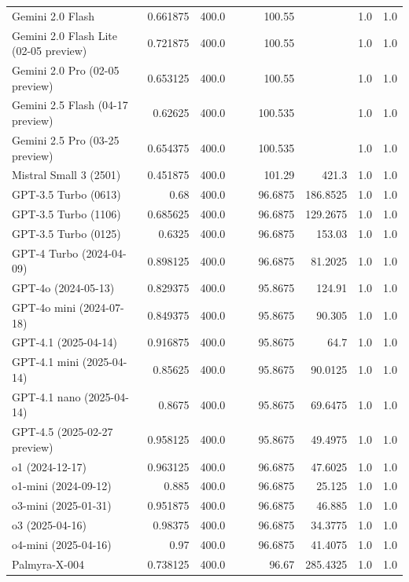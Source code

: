 \begin{table}[htp]
{\begin{tabular}{lrrrrrrrr}
Gemini 2.0 Flash & 0.661875 & 400.0 &  &  & 100.55 &  & 1.0 & 1.0 \\
Gemini 2.0 Flash Lite (02-05 preview) & 0.721875 & 400.0 &  &  & 100.55 &  & 1.0 & 1.0 \\
Gemini 2.0 Pro (02-05 preview) & 0.653125 & 400.0 &  &  & 100.55 &  & 1.0 & 1.0 \\
Gemini 2.5 Flash (04-17 preview) & 0.62625 & 400.0 &  &  & 100.535 &  & 1.0 & 1.0 \\
Gemini 2.5 Pro (03-25 preview) & 0.654375 & 400.0 &  &  & 100.535 &  & 1.0 & 1.0 \\
Mistral Small 3 (2501) & 0.451875 & 400.0 &  &  & 101.29 & 421.3 & 1.0 & 1.0 \\
GPT-3.5 Turbo (0613) & 0.68 & 400.0 &  &  & 96.6875 & 186.8525 & 1.0 & 1.0 \\
GPT-3.5 Turbo (1106) & 0.685625 & 400.0 &  &  & 96.6875 & 129.2675 & 1.0 & 1.0 \\
GPT-3.5 Turbo (0125) & 0.6325 & 400.0 &  &  & 96.6875 & 153.03 & 1.0 & 1.0 \\
GPT-4 Turbo (2024-04-09) & 0.898125 & 400.0 &  &  & 96.6875 & 81.2025 & 1.0 & 1.0 \\
GPT-4o (2024-05-13) & 0.829375 & 400.0 &  &  & 95.8675 & 124.91 & 1.0 & 1.0 \\
GPT-4o mini (2024-07-18) & 0.849375 & 400.0 &  &  & 95.8675 & 90.305 & 1.0 & 1.0 \\
GPT-4.1 (2025-04-14) & 0.916875 & 400.0 &  &  & 95.8675 & 64.7 & 1.0 & 1.0 \\
GPT-4.1 mini (2025-04-14) & 0.85625 & 400.0 &  &  & 95.8675 & 90.0125 & 1.0 & 1.0 \\
GPT-4.1 nano (2025-04-14) & 0.8675 & 400.0 &  &  & 95.8675 & 69.6475 & 1.0 & 1.0 \\
GPT-4.5 (2025-02-27 preview) & 0.958125 & 400.0 &  &  & 95.8675 & 49.4975 & 1.0 & 1.0 \\
o1 (2024-12-17) & 0.963125 & 400.0 &  &  & 96.6875 & 47.6025 & 1.0 & 1.0 \\
o1-mini (2024-09-12) & 0.885 & 400.0 &  &  & 96.6875 & 25.125 & 1.0 & 1.0 \\
o3-mini (2025-01-31) & 0.951875 & 400.0 &  &  & 96.6875 & 46.885 & 1.0 & 1.0 \\
o3 (2025-04-16) & 0.98375 & 400.0 &  &  & 96.6875 & 34.3775 & 1.0 & 1.0 \\
o4-mini (2025-04-16) & 0.97 & 400.0 &  &  & 96.6875 & 41.4075 & 1.0 & 1.0 \\
Palmyra-X-004 & 0.738125 & 400.0 &  &  & 96.67 & 285.4325 & 1.0 & 1.0 \\

\end{tabular}}
\end{table}
